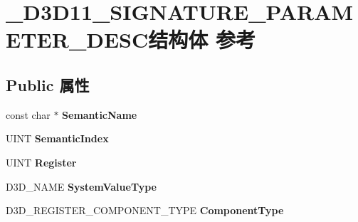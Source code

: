 \hypertarget{struct___d3_d11___s_i_g_n_a_t_u_r_e___p_a_r_a_m_e_t_e_r___d_e_s_c}{}\section{\+\_\+\+D3\+D11\+\_\+\+S\+I\+G\+N\+A\+T\+U\+R\+E\+\_\+\+P\+A\+R\+A\+M\+E\+T\+E\+R\+\_\+\+D\+E\+S\+C结构体 参考}
\label{struct___d3_d11___s_i_g_n_a_t_u_r_e___p_a_r_a_m_e_t_e_r___d_e_s_c}
\subsection*{Public 属性}
\begin{DoxyCompactItemize}
\item 
\mbox{\label{struct___d3_d11___s_i_g_n_a_t_u_r_e___p_a_r_a_m_e_t_e_r___d_e_s_c_a7282eb8946cac36b92227bab528cb63b}} 
const char $\ast$ {\bfseries Semantic\+Name}
\item 
\mbox{\label{struct___d3_d11___s_i_g_n_a_t_u_r_e___p_a_r_a_m_e_t_e_r___d_e_s_c_ad1fcecf40ddc750430de93de22255c52}} 
U\+I\+NT {\bfseries Semantic\+Index}
\item 
\mbox{\label{struct___d3_d11___s_i_g_n_a_t_u_r_e___p_a_r_a_m_e_t_e_r___d_e_s_c_ad47ea9044e031f10ecfad25e300800a2}} 
U\+I\+NT {\bfseries Register}
\item 
\mbox{\label{struct___d3_d11___s_i_g_n_a_t_u_r_e___p_a_r_a_m_e_t_e_r___d_e_s_c_a0915dbd9312f1373dc511206d78cde28}} 
D3\+D\+\_\+\+N\+A\+ME {\bfseries System\+Value\+Type}
\item 
\mbox{\label{struct___d3_d11___s_i_g_n_a_t_u_r_e___p_a_r_a_m_e_t_e_r___d_e_s_c_aea8e1f8db5786e96ba06a117b7527c15}} 
D3\+D\+\_\+\+R\+E\+G\+I\+S\+T\+E\+R\+\_\+\+C\+O\+M\+P\+O\+N\+E\+N\+T\+\_\+\+T\+Y\+PE {\bfseries Component\+Type}
\item 

\end{DoxyCompactItemize}
